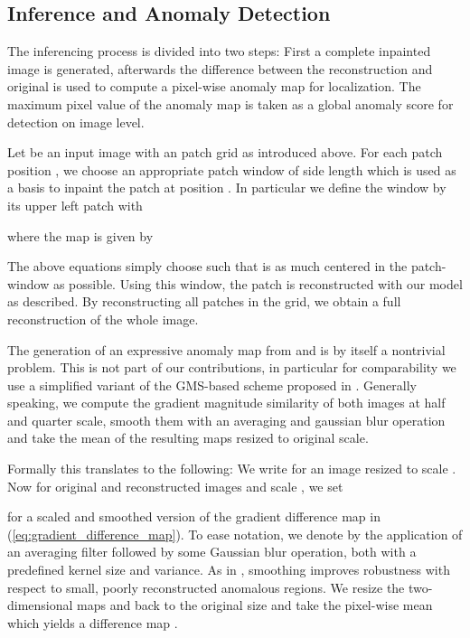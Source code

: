 \documentclass[final,5p,times,twocolumn]{elsarticle}
\begin{document}
	\subsection{Inference and Anomaly Detection}
	
	The inferencing process is divided into two steps: First a complete inpainted image is generated, afterwards the difference between the reconstruction and original is used to compute a pixel-wise anomaly map for localization. The maximum pixel value of the anomaly map is taken as a global anomaly score for detection on image level. 
	
	Let  be an input image with an  patch grid as introduced above. For each patch position , we choose an appropriate patch window of side length  which is used as a basis to inpaint the patch at position . In particular we define the window by its upper left patch  with
	
	where the map  is given by
	
	The above equations simply choose  such that  is as much centered in the  patch-window as possible. Using this window, the patch  is reconstructed with our model as described. By reconstructing all patches in the  grid, we obtain a full reconstruction  of the whole image. 
	
	The generation of an expressive anomaly map from  and  is by itself a nontrivial problem. This is not part of our contributions, in particular for comparability we use a simplified variant of the GMS-based scheme proposed in \cite{ZAVRTANIK2021107706}. 
	Generally speaking, we compute the gradient magnitude similarity of both images at half and quarter scale, smooth them with an averaging and gaussian blur operation and take the mean of the resulting maps resized to original scale. 
	
	Formally this translates to the following: We write  for an image  resized to scale . Now for original and reconstructed images  and scale , we set
	
	for a scaled and smoothed version of the gradient difference map  in (\ref{eq:gradient_difference_map}). To ease notation, we denote by  the application of an averaging filter followed by some Gaussian blur operation, both with a predefined kernel size and variance. As in \cite{ZAVRTANIK2021107706}, smoothing improves robustness with respect to small, poorly reconstructed anomalous regions. We resize the two-dimensional maps  and  back to the original size and take the pixel-wise mean which yields a difference map . 
	
\end{document}
